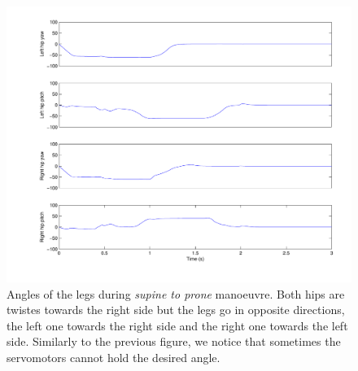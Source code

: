 \begin{figure}[htp]
\centering
    \includegraphics[width = \textwidth]{figures/sup2proneLegs}
    \caption[Angles of the legs during \emph{supine to prone} manoeuvre]{Angles of the legs during \emph{supine to prone} manoeuvre. Both hips are twistes towards the right side but the legs go in opposite directions, the left one towards the right side and the right one towards the left side. Similarly to the previous figure, we notice that sometimes the servomotors cannot hold the desired angle.}
    \label{fig:sup2proneLegs}
\end{figure}

\clearpage
